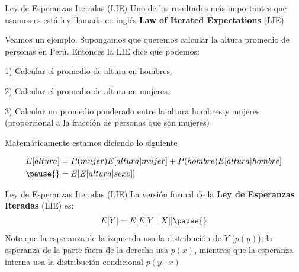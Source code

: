 \documentclass[11pt,handout,aspectratio=169]{beamer}
\begin{document}
\begin{frame}{Ley de Esperanzas Iteradas (LIE)}
Uno de los resultados más importantes que usamos es está ley llamada en inglés \textbf{Law of Iterated Expectations} (LIE)
\vspace{0.2cm}

Veamos un ejemplo. Supongamos que queremos calcular la altura promedio de personas en Perú. Entonces la LIE dice que podemos:
\vspace{0.2cm}

1) Calcular el promedio de altura en hombres. \\ \vspace{0.2cm}

2) Calcular el promedio de altura en mujeres. \\ \vspace{0.2cm}

3) Calcular un promedio ponderado entre la altura hombres y mujeres (proporcional a la fracción de personas que son mujeres)

\vspace{0.2cm}
\pause
Matemáticamente estamos diciendo lo siguiente

\begin{align*}
E[altura] &= P(mujer) E[altura | mujer] + P(hombre) E[altura|hombre] \\ \pause{}
& =  E[ E[altura | sexo ]  ]	
\end{align*}
 



\end{frame}


\begin{frame}{Ley de Esperanzas Iteradas (LIE)}
	La versión formal de la \textbf{Ley de Esperanzas Iteradas} (LIE) es:
	\begin{align*}
		E[Y]=E[E[Y\mid X]]\pause{}
	\end{align*}
	Note que la esperanza de la izquierda usa la distribución de $Y$ ($p(y)$); la esperanza de la parte fuera de la derecha usa $p(x)$, mientras que la esperanza interna usa la distribución condicional $p(y\mid x)$
	
\end{frame}
\end{document}
